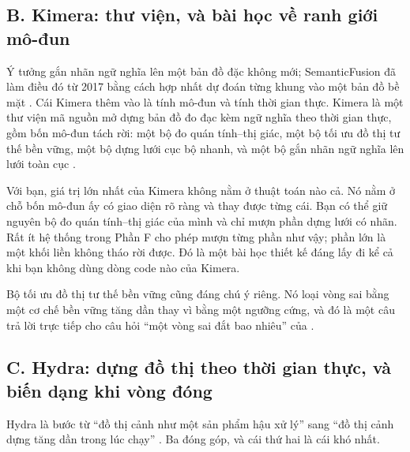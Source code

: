 \documentclass[../../deep_learning.tex]{subfiles}
\begin{document}
\subsection{B. Kimera: thư viện, và bài học về ranh giới mô-đun}
Ý tưởng gắn nhãn ngữ nghĩa lên một bản đồ đặc không mới; SemanticFusion đã làm điều đó từ 2017 bằng cách hợp nhất dự đoán từng khung vào một bản đồ bề mặt \cite{mccormac2017semanticfusion}. Cái Kimera thêm vào là tính mô-đun và tính thời gian thực. Kimera là một thư viện mã nguồn mở dựng bản đồ đo đạc kèm ngữ nghĩa theo thời gian thực, gồm bốn mô-đun tách rời: một bộ đo quán tính--thị giác, một bộ tối ưu đồ thị tư thế bền vững, một bộ dựng lưới cục bộ nhanh, và một bộ gắn nhãn ngữ nghĩa lên lưới toàn cục \cite{rosinol2020kimera}.

Với bạn, giá trị lớn nhất của Kimera không nằm ở thuật toán nào cả. Nó nằm ở chỗ bốn mô-đun ấy có giao diện rõ ràng và thay được từng cái. Bạn có thể giữ nguyên bộ đo quán tính--thị giác của mình và chỉ mượn phần dựng lưới có nhãn. Rất ít hệ thống trong Phần F cho phép mượn từng phần như vậy; phần lớn là một khối liền không tháo rời được. Đó là một bài học thiết kế đáng lấy đi kể cả khi bạn không dùng dòng code nào của Kimera.

Bộ tối ưu đồ thị tư thế bền vững cũng đáng chú ý riêng. Nó loại vòng sai bằng một cơ chế bền vững tăng dần thay vì bằng một ngưỡng cứng, và đó là một câu trả lời trực tiếp cho câu hỏi ``một vòng sai đắt bao nhiêu'' của .

\subsection{C. Hydra: dựng đồ thị theo thời gian thực, và biến dạng khi vòng đóng}
Hydra là bước từ ``đồ thị cảnh như một sản phẩm hậu xử lý'' sang ``đồ thị cảnh dựng tăng dần trong lúc chạy'' \cite{hughes2022hydra}. Ba đóng góp, và cái thứ hai là cái khó nhất.
\end{document}
